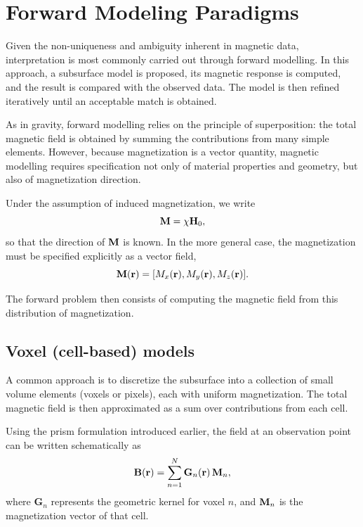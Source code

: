 \section{Forward Modeling Paradigms}

Given the non-uniqueness and ambiguity inherent in magnetic data, interpretation is most commonly carried out through forward modelling. In this approach, a subsurface model is proposed, its magnetic response is computed, and the result is compared with the observed data. The model is then refined iteratively until an acceptable match is obtained.

As in gravity, forward modelling relies on the principle of superposition: the total magnetic field is obtained by summing the contributions from many simple elements. However, because magnetization is a vector quantity, magnetic modelling requires specification not only of material properties and geometry, but also of magnetization direction.

Under the assumption of induced magnetization, we write
\begin{equation}
    \vb{M} = \chi \vb{H}_0,
\end{equation}
so that the direction of $\vb{M}$ is known. In the more general case, the magnetization must be specified explicitly as a vector field,
\begin{equation}
    \vb{M}(\vb{r}) = [M_x(\vb{r}), M_y(\vb{r}), M_z(\vb{r})].
\end{equation}

The forward problem then consists of computing the magnetic field from this distribution of magnetization.

\subsection{Voxel (cell-based) models}

A common approach is to discretize the subsurface into a collection of small volume elements (voxels or pixels), each with uniform magnetization. The total magnetic field is then approximated as a sum over contributions from each cell.

Using the prism formulation introduced earlier, the field at an observation point can be written schematically as
\begin{equation}
    \vb{B}(\vb{r}) = \sum_{n=1}^{N} \mathbf{G}_n(\vb{r}) \, \vb{M}_n,
\end{equation}
where $\mathbf{G}_n$ represents the geometric kernel for voxel $n$, and $\vb{M}_n$ is the magnetization vector of that cell.

